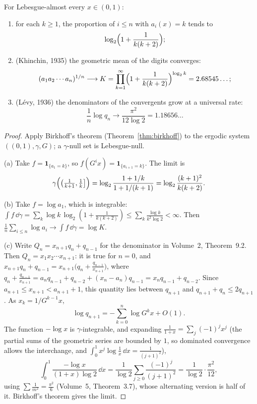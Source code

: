 \begin{theorem}\label{thm:cfstats}
For Lebesgue-almost every $x\in(0,1)$:
\begin{enumerate}[label=(\alph*)]
\item for each $k\ge1$, the proportion of $i\le n$ with $a_i(x)=k$ tends to
\[
\log_2\Bigl(1+\frac1{k(k+2)}\Bigr);
\]
\item (Khinchin, 1935) the geometric mean of the digits converges:
\[
(a_1a_2\cdots a_n)^{1/n}\longrightarrow K=\prod_{k=1}^\infty\Bigl(1+\frac1{k(k+2)}\Bigr)^{\log_2k}=2.68545\ldots;
\]
\item (L\'evy, 1936) the denominators of the convergents grow at a universal rate:
\[
\frac1n\log q_n\longrightarrow\frac{\pi^2}{12\log2}=1.18656\ldots
\]
\end{enumerate}
\end{theorem}
\begin{proof}
Apply Birkhoff's theorem (Theorem~\ref{thm:birkhoff}) to the ergodic system $((0,1),\gamma,G)$; a $\gamma$-null set is Lebesgue-null.

(a) Take $f=\mathbf 1_{\{a_1=k\}}$, so $f(G^ix)=\mathbf 1_{\{a_{i+1}=k\}}$. The limit is
\[
\gamma\Bigl(\bigl(\tfrac1{k+1},\tfrac1k\bigr]\Bigr)=\log_2\frac{1+1/k}{1+1/(k+1)}=\log_2\frac{(k+1)^2}{k(k+2)}.
\]

(b) Take $f=\log a_1$, which is integrable: $\int f\,\dd\gamma=\sum_k\log k\,\log_2(1+\frac1{k(k+2)})\le\sum_k\frac{\log k}{k^2\log 2}<\infty$. Then $\frac1n\sum_{i\le n}\log a_i\to\int f\,\dd\gamma=\log K$.

(c) Write $Q_n=x_{n+1}q_n+q_{n-1}$ for the denominator in Volume~2, Theorem~9.2. Then $Q_n=x_1x_2\cdots x_{n+1}$: it is true for $n=0$, and $x_{n+1}q_n+q_{n-1}=x_{n+1}\bigl(q_n+\frac{q_{n-1}}{x_{n+1}}\bigr)$, where
$q_n+\frac{q_{n-1}}{x_{n+1}}=a_nq_{n-1}+q_{n-2}+(x_n-a_n)q_{n-1}=x_nq_{n-1}+q_{n-2}$. Since $a_{n+1}\le x_{n+1}<a_{n+1}+1$, this quantity lies between $q_{n+1}$ and $q_{n+1}+q_n\le2q_{n+1}$. As $x_k=1/G^{k-1}x$,
\[
\log q_{n+1}=-\sum_{k=0}^{n}\log G^kx+O(1).
\]
The function $-\log x$ is $\gamma$-integrable, and expanding $\frac1{1+x}=\sum_j(-1)^jx^j$ (the partial sums of the geometric series are bounded by $1$, so dominated convergence allows the interchange, and $\int_0^1x^j\log\frac1x\,\dd x=\frac1{(j+1)^2}$),
\[
\int_0^1\frac{-\log x}{(1+x)\log2}\,\dd x=\frac1{\log2}\sum_{j\ge0}\frac{(-1)^j}{(j+1)^2}=\frac1{\log2}\cdot\frac{\pi^2}{12},
\]
using $\sum\frac1{m^2}=\frac{\pi^2}6$ (Volume~5, Theorem~3.7), whose alternating version is half of it. Birkhoff's theorem gives the limit.
\end{proof}

